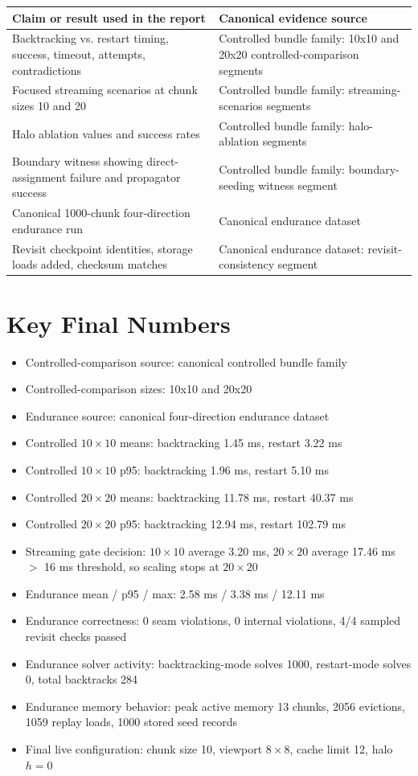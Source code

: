 \documentclass[12pt,a4paper]{report}
\begin{document}
\begin{center}
\small
\begin{tabular}{>{\raggedright\arraybackslash}p{5.4cm} >{\raggedright\arraybackslash}p{5.4cm}}
\toprule
Claim or result used in the report & Canonical evidence source \\
\midrule
Backtracking vs. restart timing, success, timeout, attempts, contradictions & Controlled bundle family: 10x10 and 20x20 controlled-comparison segments \\
Focused streaming scenarios at chunk sizes 10 and 20 & Controlled bundle family: streaming-scenarios segments \\
Halo ablation values and success rates & Controlled bundle family: halo-ablation segments \\
Boundary witness showing direct-assignment failure and propagator success & Controlled bundle family: boundary-seeding witness segment \\
Canonical 1000-chunk four-direction endurance run & Canonical endurance dataset \\
Revisit checkpoint identities, storage loads added, checksum matches & Canonical endurance dataset: revisit-consistency segment \\
\bottomrule
\end{tabular}
\end{center}

\chapter{Key Final Numbers}
\begin{itemize}
\item Controlled-comparison source: canonical controlled bundle family
\item Controlled-comparison sizes: 10x10 and 20x20
\item Endurance source: canonical four-direction endurance dataset
\item Controlled $10 \times 10$ means: backtracking 1.45 ms, restart 3.22 ms
\item Controlled $10 \times 10$ p95: backtracking 1.96 ms, restart 5.10 ms
\item Controlled $20 \times 20$ means: backtracking 11.78 ms, restart 40.37 ms
\item Controlled $20 \times 20$ p95: backtracking 12.94 ms, restart 102.79 ms
\item Streaming gate decision: $10 \times 10$ average 3.20 ms, $20 \times 20$ average 17.46 ms $>$ 16 ms threshold, so scaling stops at $20 \times 20$
\item Endurance mean / p95 / max: 2.58 ms / 3.38 ms / 12.11 ms
\item Endurance correctness: 0 seam violations, 0 internal violations, 4/4 sampled revisit checks passed
\item Endurance solver activity: backtracking-mode solves 1000, restart-mode solves 0, total backtracks 284
\item Endurance memory behavior: peak active memory 13 chunks, 2056 evictions, 1059 replay loads, 1000 stored seed records
\item Final live configuration: chunk size 10, viewport $8\times8$, cache limit 12, halo $h=0$
\end{itemize}
\end{document}
